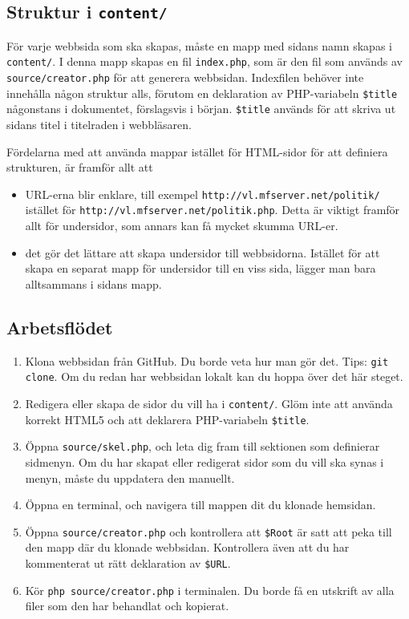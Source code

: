 \documentclass[a4paper,10pt]{article}
\begin{document}
\subsection{Struktur i {\tt content/}}
För varje webbsida som ska skapas, måste en mapp med sidans namn skapas i {\tt content/}. I denna mapp skapas en fil {\tt index.php}, som är den fil som används av {\tt source/creator.php} för att generera webbsidan. Indexfilen behöver inte innehålla någon struktur alls, förutom en deklaration av PHP-variabeln {\tt \$title} någonstans i dokumentet, förslagsvis i början. {\tt \$title} används för att skriva ut sidans titel i titelraden i webbläsaren. 

Fördelarna med att använda mappar istället för HTML-sidor för att definiera strukturen, är framför allt att

\begin{itemize}
	\item URL-erna blir enklare, till exempel {\tt http://vl.mfserver.net/politik/} istället för {\tt http://vl.mfserver.net/politik.php}. Detta är viktigt framför allt för undersidor, som annars kan få mycket skumma URL-er. 
	\item det gör det lättare att skapa undersidor till webbsidorna. Istället för att skapa en separat mapp för undersidor till en viss sida, lägger man bara alltsammans i sidans mapp. 
\end{itemize}

\subsection{Arbetsflödet}
\begin{enumerate}
	\item Klona webbsidan från GitHub. Du borde veta hur man gör det. Tips: {\tt git clone}. Om du redan har webbsidan lokalt kan du hoppa över det här steget. 
	\item Redigera eller skapa de sidor du vill ha i {\tt content/}. Glöm inte att använda korrekt HTML5 och att deklarera PHP-variabeln {\tt \$title}. 
	\item Öppna {\tt source/skel.php}, och leta dig fram till sektionen som definierar sidmenyn. Om du har skapat eller redigerat sidor som du vill ska synas i menyn, måste du uppdatera den manuellt. 
	\item Öppna en terminal, och navigera till mappen dit du klonade hemsidan. 
	\item Öppna {\tt source/creator.php} och kontrollera att {\tt \$Root} är satt att peka till den mapp där du klonade webbsidan. Kontrollera även att du har kommenterat ut rätt deklaration av {\tt \$URL}. 
	\item Kör {\tt php source/creator.php} i terminalen. Du borde få en utskrift av alla filer som den har behandlat och kopierat. 
\end{enumerate}
\end{document}
